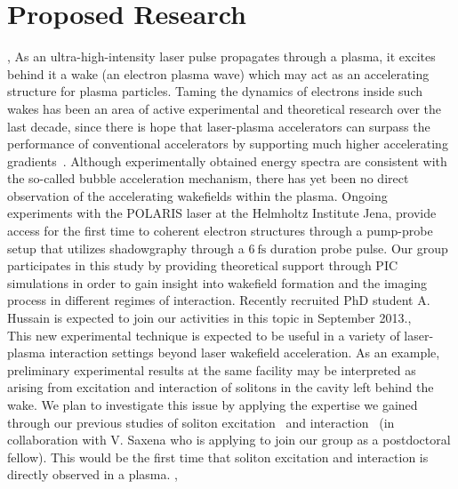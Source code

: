\documentclass[11pt,a4paper,final]{moderncv}
\begin{document}
\section{Proposed Research}
\sep
{}
As an ultra-high-intensity laser pulse propagates through a plasma, it excites behind it a wake (an electron plasma wave) 
which may act as an accelerating structure for plasma particles. Taming the dynamics of electrons inside such wakes 
has been an area of active experimental and theoretical research over 
the last decade, since there is hope that laser-plasma accelerators can surpass the performance of 
conventional accelerators by supporting 
much higher accelerating gradients~\cite{mangles04,geddes04,faure04,esarey09}. Although experimentally obtained 
energy spectra are consistent 
with the so-called bubble acceleration mechanism,
there has yet been no direct observation of the accelerating wakefields within the plasma. 
Ongoing experiments with the POLARIS laser at the
Helmholtz Institute Jena, provide access for the first time to coherent electron structures 
through a pump-probe setup that utilizes shadowgraphy 
through a $6~\mathrm{fs}$ duration probe pulse. Our group participates in this study by providing 
theoretical support through PIC simulations in order to
gain insight into wakefield formation and the imaging process in different regimes of interaction. 
Recently recruited PhD student A. Hussain is expected to join our activities in this topic in September 2013.\sep\\
This new experimental technique is expected to be useful in a variety of 
laser-plasma interaction settings beyond laser wakefield acceleration. 
As an example, preliminary experimental results at the same facility may be interpreted as
arising from excitation and interaction of solitons in the cavity left behind the wake. 
We plan to investigate this issue by applying the expertise we gained through
our previous studies of soliton excitation~\cite{SSL10,SSL10-1} 
and interaction~\cite{saxena2013} (in collaboration with V. Saxena 
who is applying to join our group as a postdoctoral fellow).
This would be the first time that soliton excitation and 
interaction is directly observed in a plasma. 
\sep
\end{document}
